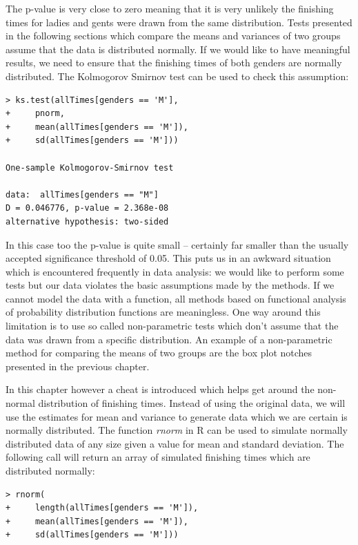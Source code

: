 \documentclass{tufte-book} %
\begin{document}
The \hbox{p-value} is very close to zero meaning that it is very unlikely the finishing times for ladies and gents were drawn from the same distribution. Tests presented in the following sections which compare the means and variances of two groups assume that the data is distributed normally. If we would like to have meaningful results, we need to ensure that the finishing times of both genders are normally distributed. The Kolmogorov Smirnov test can be used to check this assumption:

\begin{Verbatim}
> ks.test(allTimes[genders == 'M'],
+     pnorm,
+     mean(allTimes[genders == 'M']),
+     sd(allTimes[genders == 'M']))

One-sample Kolmogorov-Smirnov test

data:  allTimes[genders == "M"]
D = 0.046776, p-value = 2.368e-08
alternative hypothesis: two-sided
\end{Verbatim}

In this case too the \hbox{p-value} is quite small -- certainly far smaller than the usually accepted significance threshold of 0.05. This puts us in an awkward situation which is encountered frequently in data analysis: we would like to perform some tests but our data violates the basic assumptions made by the methods. If we cannot model the data with a function, all methods based on functional analysis of probability distribution functions are meaningless. One way around this limitation is to use so called non-parametric tests which don't assume that the data was drawn from a specific distribution. An example of a non-parametric method for comparing the means of two groups are the box plot notches presented in the previous chapter.

In this chapter however a cheat is introduced which helps get around the non-normal distribution of finishing times. Instead of using the original data, we will use the estimates for mean and variance to generate data which we are certain is normally distributed. The function {\em rnorm} in R can be used to simulate normally distributed data of any size given a value for mean and standard deviation. The following call will return an array of simulated finishing times which are distributed normally:

\begin{Verbatim}
> rnorm(
+     length(allTimes[genders == 'M']), 
+     mean(allTimes[genders == 'M']), 
+     sd(allTimes[genders == 'M']))
\end{Verbatim}
\end{document}
